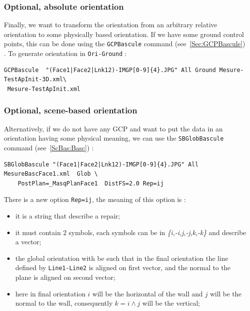 
\subsubsection{Optional, absolute orientation}

Finally, we want to transform the orientation from an arbitrary relative
orientation to some physically based orientation. If we have some ground
control points, this can be done using the {\tt GCPBascule} command (see~\ref{Sec:GCPBascule}) . To
generate orientation in {\tt Ori-Ground} :

\begin{verbatim}
GCPBascule  "(Face1|Face2|Lnk12)-IMGP[0-9]{4}.JPG" All Ground Mesure-TestApInit-3D.xml\
 Mesure-TestApInit.xml
\end{verbatim}


\subsubsection{Optional, scene-based orientation}

Alternatively, if we do not have any GCP and want to put the data in an orientation
having some physical meaning, we can use the {\tt SBGlobBascule} command (see~\ref{ScBas:Basc}) :

\begin{verbatim}
SBGlobBascule "(Face1|Face2|Lnk12)-IMGP[0-9]{4}.JPG" All MesureBascFace1.xml  Glob \
    PostPlan=_MasqPlanFace1  DistFS=2.0 Rep=ij
\end{verbatim}

There is a new option {\tt Rep=ij}, the meaning of this option is :
\label{SGB:Rep}

\begin{itemize}
   \item it is a string that describe a repair;
   \item it must contain $2$ symbols, each symbols can be in \emph{\{i,-i,j,-j,k,-k\}} and describe a vector;
   \item the global orientation with be such that in the final orientation the line
         defined by {\tt Line1-Line2} is aligned on first vector, and the normal to the plane is aligned on second vector;
   \item here in final orientation $i$ will be the horizontal of the wall and $j$ will be the
         normal to the wall, consequently $k=i\wedge j$ will be the vertical;
\end{itemize}


